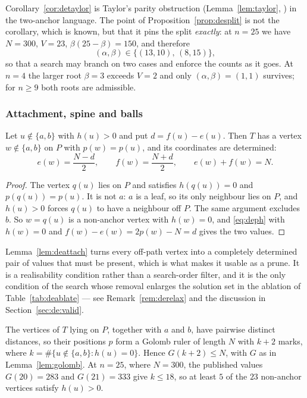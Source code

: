 Corollary~\ref{cor:detaylor} is Taylor's parity obstruction
(Lemma~\ref{lem:taylor}, \cite{Taylor1977}) in the two-anchor language.  The
point of Proposition~\ref{prop:desplit} is not the corollary, which is known,
but that it pins the split \emph{exactly}: at $n=25$ we have $N=300$, $V=23$,
$\beta(25-\beta)=150$, and therefore
\begin{equation}\label{eq:desplit25}
  (\alpha,\beta)\in\bigl\{(13,10),\,(8,15)\bigr\},
\end{equation}
so that a search may branch on two cases and enforce the counts as it goes.  At
$n=4$ the larger root $\beta=3$ exceeds $V=2$ and only $(\alpha,\beta)=(1,1)$
survives; for $n\ge9$ both roots are admissible.

\subsubsection*{Attachment, spine and balls}

\begin{lemma}[attachment]\label{lem:deattach}
Let $u\notin\{a,b\}$ with $h(u)>0$ and put $d=f(u)-e(u)$.  Then $T$ has a
vertex $w\notin\{a,b\}$ on $P$ with $p(w)=p(u)$, and its coordinates are
determined:
\[
  e(w)=\frac{N-d}2,\qquad f(w)=\frac{N+d}2,\qquad e(w)+f(w)=N .
\]
\end{lemma}

\begin{proof}
The vertex $q(u)$ lies on $P$ and satisfies $h(q(u))=0$ and $p(q(u))=p(u)$.  It
is not $a$: $a$ is a leaf, so its only neighbour lies on $P$, and $h(u)>0$
forces $q(u)$ to have a neighbour off $P$.  The same argument excludes $b$.  So
$w=q(u)$ is a non-anchor vertex with $h(w)=0$, and \eqref{eq:deph} with
$h(w)=0$ and $f(w)-e(w)=2p(w)-N=d$ gives the two values.
\end{proof}

Lemma~\ref{lem:deattach} turns every off-path vertex into a completely
determined pair of values that must be present, which is what makes it usable
as a prune.  It is a realisability condition rather than a search-order filter,
and it is the only condition of the search whose removal enlarges the solution
set in the ablation of Table~\ref{tab:deablate} --- see
Remark~\ref{rem:derelax} and the discussion in Section~\ref{sec:de:valid}.

\begin{lemma}\label{lem:despine}
The vertices of $T$ lying on $P$, together with $a$ and $b$, have pairwise
distinct distances, so their positions $p$ form a Golomb ruler of length $N$
with $k+2$ marks, where $k=\#\{u\notin\{a,b\}:h(u)=0\}$.  Hence
$G(k+2)\le N$, with $G$ as in Lemma~\ref{lem:golomb}.  At $n=25$, where
$N=300$, the published values $G(20)=283$ and $G(21)=333$ give $k\le18$, so at
least $5$ of the $23$ non-anchor vertices satisfy $h(u)>0$.
\end{lemma}

